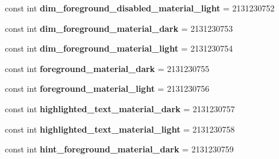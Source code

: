\begin{DoxyCompactItemize}
\item 
\hypertarget{classClient_1_1Droid_1_1Resource_1_1Color_a6bb6bc35dfd46eb0e399095b0c29d9f8}{}const int {\bfseries dim\+\_\+foreground\+\_\+disabled\+\_\+material\+\_\+light} = 2131230752\label{classClient_1_1Droid_1_1Resource_1_1Color_a6bb6bc35dfd46eb0e399095b0c29d9f8}

\item 
\hypertarget{classClient_1_1Droid_1_1Resource_1_1Color_ad49fdc80762a4b6cdf10245113b2c516}{}const int {\bfseries dim\+\_\+foreground\+\_\+material\+\_\+dark} = 2131230753\label{classClient_1_1Droid_1_1Resource_1_1Color_ad49fdc80762a4b6cdf10245113b2c516}

\item 
\hypertarget{classClient_1_1Droid_1_1Resource_1_1Color_ad5d0b1620026b1307518bf24849ed6f5}{}const int {\bfseries dim\+\_\+foreground\+\_\+material\+\_\+light} = 2131230754\label{classClient_1_1Droid_1_1Resource_1_1Color_ad5d0b1620026b1307518bf24849ed6f5}

\item 
\hypertarget{classClient_1_1Droid_1_1Resource_1_1Color_ad8ce497e72acc432a08660f39db99988}{}const int {\bfseries foreground\+\_\+material\+\_\+dark} = 2131230755\label{classClient_1_1Droid_1_1Resource_1_1Color_ad8ce497e72acc432a08660f39db99988}

\item 
\hypertarget{classClient_1_1Droid_1_1Resource_1_1Color_a81a24f77054bf00664f5453a475b8ca7}{}const int {\bfseries foreground\+\_\+material\+\_\+light} = 2131230756\label{classClient_1_1Droid_1_1Resource_1_1Color_a81a24f77054bf00664f5453a475b8ca7}

\item 
\hypertarget{classClient_1_1Droid_1_1Resource_1_1Color_a7daf96b1f6a6b267f87ddf289df07b03}{}const int {\bfseries highlighted\+\_\+text\+\_\+material\+\_\+dark} = 2131230757\label{classClient_1_1Droid_1_1Resource_1_1Color_a7daf96b1f6a6b267f87ddf289df07b03}

\item 
\hypertarget{classClient_1_1Droid_1_1Resource_1_1Color_a17707ed584d51b77334ee2947007f32c}{}const int {\bfseries highlighted\+\_\+text\+\_\+material\+\_\+light} = 2131230758\label{classClient_1_1Droid_1_1Resource_1_1Color_a17707ed584d51b77334ee2947007f32c}

\item 
\hypertarget{classClient_1_1Droid_1_1Resource_1_1Color_a3a1e95a951647cda44910522fc8db97c}{}const int {\bfseries hint\+\_\+foreground\+\_\+material\+\_\+dark} = 2131230759\label{classClient_1_1Droid_1_1Resource_1_1Color_a3a1e95a951647cda44910522fc8db97c}


\end{DoxyCompactItemize}
